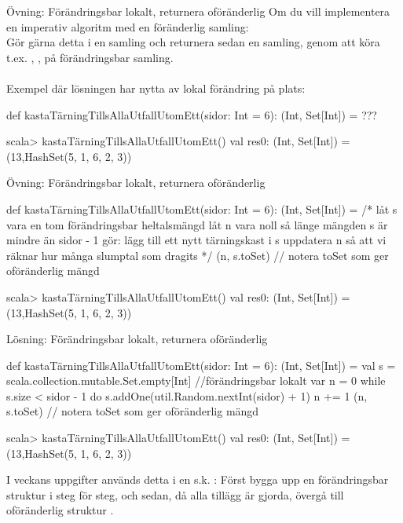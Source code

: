 \begin{Slide}{Övning: Förändringsbar lokalt, returnera oföränderlig}
\SlideFontSmall
Om du vill implementera en imperativ algoritm med en föränderlig samling:\\
Gör gärna detta  i en  samling och returnera sedan en  samling, genom att köra t.ex. , ,  på förändringsbar samling.\\~\\
Exempel där lösningen har nytta av lokal förändring på plats:
\begin{Code}
def kastaTärningTillsAllaUtfallUtomEtt(sidor: Int = 6): (Int, Set[Int]) = ???
\end{Code}
\begin{REPL}
scala> kastaTärningTillsAllaUtfallUtomEtt()
val res0: (Int, Set[Int]) = (13,HashSet(5, 1, 6, 2, 3))
\end{REPL}
\end{Slide}


\begin{Slide}{Övning: Förändringsbar lokalt, returnera oföränderlig}
\SlideFontSmall
\begin{Code}
def kastaTärningTillsAllaUtfallUtomEtt(sidor: Int = 6): (Int, Set[Int]) = 
  /* 
    låt s vara en tom förändringsbar heltalsmängd
    låt n vara noll
    så länge mängden s är mindre än sidor - 1 gör:
      lägg till ett nytt tärningskast i s
      uppdatera n så att vi räknar hur många slumptal som dragits
  */
  (n, s.toSet)   // notera toSet som ger oföränderlig mängd
\end{Code}
\begin{REPL}
scala> kastaTärningTillsAllaUtfallUtomEtt()
val res0: (Int, Set[Int]) = (13,HashSet(5, 1, 6, 2, 3))
\end{REPL}
\end{Slide}


\begin{Slide}{Lösning: Förändringsbar lokalt, returnera oföränderlig}
\SlideFontSmall
\begin{Code}
def kastaTärningTillsAllaUtfallUtomEtt(sidor: Int = 6): (Int, Set[Int]) = 
  val s = scala.collection.mutable.Set.empty[Int] //förändringsbar lokalt
  var n = 0
  while s.size < sidor - 1 do
    s.addOne(util.Random.nextInt(sidor) + 1)
    n += 1
  (n, s.toSet)   // notera toSet som ger oföränderlig mängd
\end{Code}
\begin{REPL}
scala> kastaTärningTillsAllaUtfallUtomEtt()
val res0: (Int, Set[Int]) = (13,HashSet(5, 1, 6, 2, 3))
\end{REPL}
I veckans uppgifter används detta i en s.k. : Först bygga upp en förändringsbar struktur i  steg för steg,  
och sedan, då alla tillägg är gjorda, övergå till oföränderlig struktur . 
\end{Slide}


